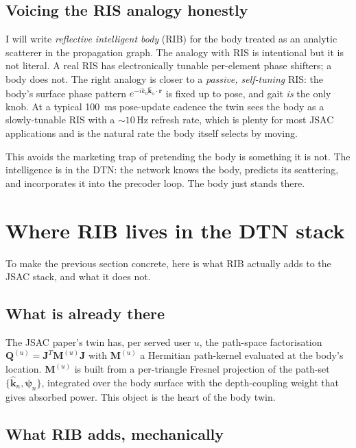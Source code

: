 \documentclass[11pt,a4paper]{article}
\theoremstyle{definition}
\newcommand{\khat}{\hat{\bm{k}}}
\newcommand{\rr}{\mathbf{r}}
\newcommand{\kout}{\hat{\bm{k}}_{\mathrm{o}}}
\newcommand{\Jmat}{\mathbf{J}}
\begin{document}
\subsection{Voicing the RIS analogy honestly}

I will write \emph{reflective intelligent body} (RIB) for the body
treated as an analytic scatterer in the propagation graph.  The
analogy with RIS is intentional but it is not literal.  A real RIS
has electronically tunable per-element phase shifters; a body does
not.  The right analogy is closer to a \emph{passive,
self-tuning} RIS: the body's surface phase pattern
$e^{-ik_0\kout\cdot\rr}$ is fixed up to pose, and gait
\emph{is} the only knob.  At a typical \SI{100}{ms} pose-update
cadence the twin sees the body as a slowly-tunable RIS with a
$\sim 10$\,Hz refresh rate, which is plenty for most JSAC
applications and is the natural rate the body itself selects by
moving.

This avoids the marketing trap of pretending the body is something
it is not.  The intelligence is in the DTN: the network knows the
body, predicts its scattering, and incorporates it into the precoder
loop.  The body just stands there.

\section{Where RIB lives in the DTN stack}\label{sec:dtn}

To make the previous section concrete, here is what RIB actually
adds to the JSAC stack, and what it does not.

\subsection{What is already there}

The JSAC paper's twin has, per served user $u$, the path-space
factorisation $\mathbf{Q}^{(u)}=\Jmat^T\mathbf{M}^{(u)}\Jmat$ with
$\mathbf{M}^{(u)}$ a Hermitian path-kernel evaluated at the body's
location.  $\mathbf{M}^{(u)}$ is built from a per-triangle Fresnel
projection of the path-set $\{\khat_n,\bm\psi_n\}$, integrated over
the body surface with the depth-coupling weight that gives absorbed
power.  This object is the heart of the body twin.

\subsection{What RIB adds, mechanically}
\end{document}
